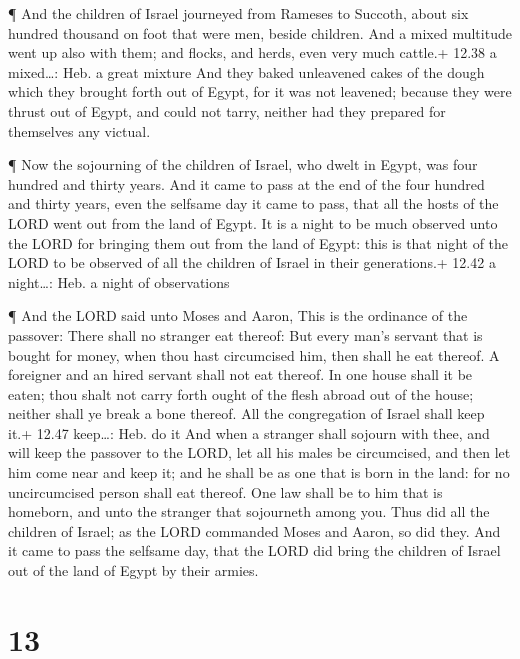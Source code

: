  ¶ And the children of Israel journeyed from Rameses to
Succoth, about six hundred thousand on foot that were men, beside
children.  And a mixed multitude went up also with them;
and flocks, and herds, even very much cattle.+ 12.38 a mixed\ldots: Heb.
a great mixture  And they baked unleavened cakes of the
dough which they brought forth out of Egypt, for it was not leavened;
because they were thrust out of Egypt, and could not tarry, neither had
they prepared for themselves any victual.

 ¶ Now the sojourning of the children of Israel, who dwelt
in Egypt, was four hundred and thirty years.  And it came
to pass at the end of the four hundred and thirty years, even the
selfsame day it came to pass, that all the hosts of the LORD went out
from the land of Egypt.  It is a night to be much observed
unto the LORD for bringing them out from the land of Egypt: this is that
night of the LORD to be observed of all the children of Israel in their
generations.+ 12.42 a night\ldots: Heb. a night of observations

 ¶ And the LORD said unto Moses and Aaron, This is the
ordinance of the passover: There shall no stranger eat thereof:
 But every man's servant that is bought for money, when
thou hast circumcised him, then shall he eat thereof.  A
foreigner and an hired servant shall not eat thereof.  In
one house shall it be eaten; thou shalt not carry forth ought of the
flesh abroad out of the house; neither shall ye break a bone thereof.
 All the congregation of Israel shall keep it.+ 12.47
keep\ldots: Heb. do it  And when a stranger shall sojourn
with thee, and will keep the passover to the LORD, let all his males be
circumcised, and then let him come near and keep it; and he shall be as
one that is born in the land: for no uncircumcised person shall eat
thereof.  One law shall be to him that is homeborn, and
unto the stranger that sojourneth among you.  Thus did all
the children of Israel; as the LORD commanded Moses and Aaron, so did
they.  And it came to pass the selfsame day, that the LORD
did bring the children of Israel out of the land of Egypt by their
armies.

\hypertarget{section-12}{%
\section{13}\label{section-12}}

